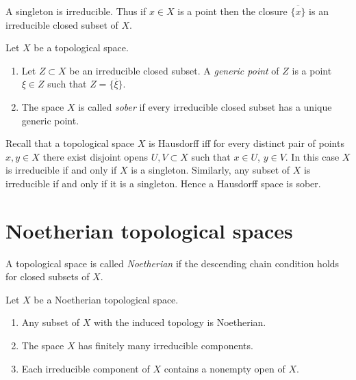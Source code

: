 \noindent
A singleton is irreducible. Thus if $x \in X$ is a point
then the closure $\overline{\{x\}}$ is an irreducible closed
subset of $X$. 

\begin{definition}
\label{definition-generic-point}
Let $X$ be a topological space.
\begin{enumerate}
\item Let $Z \subset X$ be an irreducible closed subset.
A {\it generic point} of $Z$ is a point $\xi \in Z$ such
that $Z = \overline{\{\xi\}}$.
\item The space $X$ is called {\it sober} if every
irreducible closed subset has a unique generic point.
\end{enumerate}
\end{definition}

\begin{example}
\label{example-Hausdorff}
Recall that a topological space $X$ is Hausdorff iff for every
distinct pair of points $x, y \in X$ there exist disjoint
opens $U, V \subset X$ such that $x \in U$, $y \in V$.
In this case $X$ is irreducible if and only if $X$ is
a singleton. Similarly, any subset of $X$ is irreducible
if and only if it is a singleton. Hence a Hausdorff space is
sober.
\end{example}



\section{Noetherian topological spaces}
\label{section-noetherian}

\begin{definition}
\label{definition-noetherian}
A topological space is called {\it Noetherian}
if the descending chain condition holds for
closed subsets of $X$.
\end{definition}

\begin{lemma}
\label{lemma-Noetherian}
Let $X$ be a Noetherian topological space.
\begin{enumerate}
\item Any subset of $X$ with the induced topology is Noetherian.
\item The space $X$ has finitely many irreducible components.
\item Each irreducible component of $X$ contains a nonempty open of $X$.
\end{enumerate}
\end{lemma}

